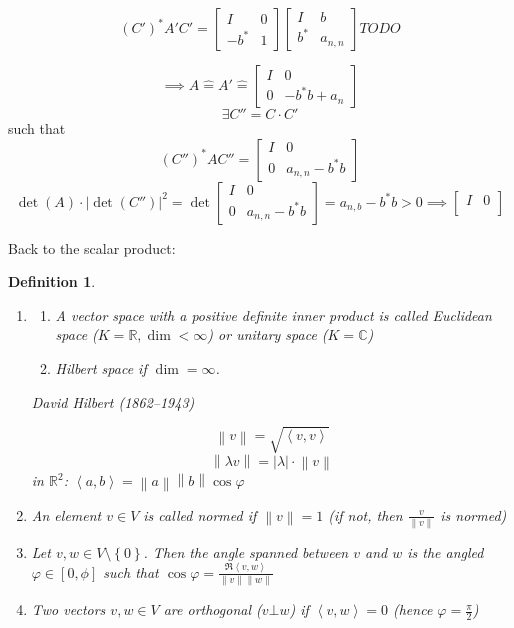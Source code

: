 \documentclass{article}
\newtheorem{definition}{Definition}  \numberwithin{definition}{section}
\newcommand{\set}[1]{\left\{#1\right\}}
\newcommand{\ip}[2]{\left\langle#1,#2\right\rangle} %
\newcommand{\norm}[1]{\left\|#1\right\|}
\newcommand{\card}[1]{\left|#1\right|}
\begin{document}
\[
  (C')^* A'C' =\left[
    \begin{array}{c|c}
      I & 0 \\
      \hline
      -b^* & 1
    \end{array}
  \right] \left[
    \begin{array}{c|c}
      I & b \\
      \hline
      b^* & a_{n,n}
    \end{array}
  \right]
  TODO
\]

\[
  \implies A \hat= A' \hat= \begin{bmatrix}
    I & 0 \\ 0 & -b^* b + a_n
  \end{bmatrix}
\] \[
  \exists C'' = C \cdot C'
\]
such that
\[
  (C'')^* AC'' = \left[
    \begin{array}{c|c}
      I & 0 \\
      \hline
      0 & a_{n,n} - b^* b
    \end{array}
  \right]
\] \[
  \det(A) \cdot \card{\det(C'')}^2 = \det\begin{bmatrix}
    I & 0 \\
    0 & a_{n,n} - b^* b
  \end{bmatrix} = a_{n,b} - b^* b > 0
  \implies \begin{bmatrix}
    I & 0 \\

  \end{bmatrix}
\]

Back to the scalar product:

\begin{definition} %
  \begin{enumerate}
    \item
      \begin{enumerate}
        \item A vector space with a positive definite inner product
          is called \emph{Euclidean space} ($K = \mathbb R, \dim < \infty$)
          or \emph{unitary space} ($K = \mathbb C$)
        \item Hilbert space if $\dim = \infty$.
      \end{enumerate}

      David Hilbert (1862--1943)

      \[ \norm{v} = \sqrt{\ip vv} \]
      \[ \norm{\lambda v} = \card{\lambda} \cdot \norm{v} \]
      in $\mathbb R^2$: $\ip ab = \norm{a} \norm{b} \cos{\varphi}$
    \item An element $v \in V$ is called \emph{normed} if $\norm{v} = 1$
      (if not, then $\frac{v}{\norm{v}}$ is normed)
    \item
      Let $v, w \in V \setminus \set{0}$. Then the angle spanned between $v$ and $w$ is the angled $\varphi \in [0, \phi]$
      such that $\cos{\varphi} = \frac{\Re{\ip vw}}{\norm{v} \norm{w}}$
    \item Two vectors $v, w \in V$ are orthogonal ($v \bot w$)
      if $\ip vw = 0$ (hence $\varphi = \frac\pi2$)
  \end{enumerate}
\end{definition}
\end{document}
